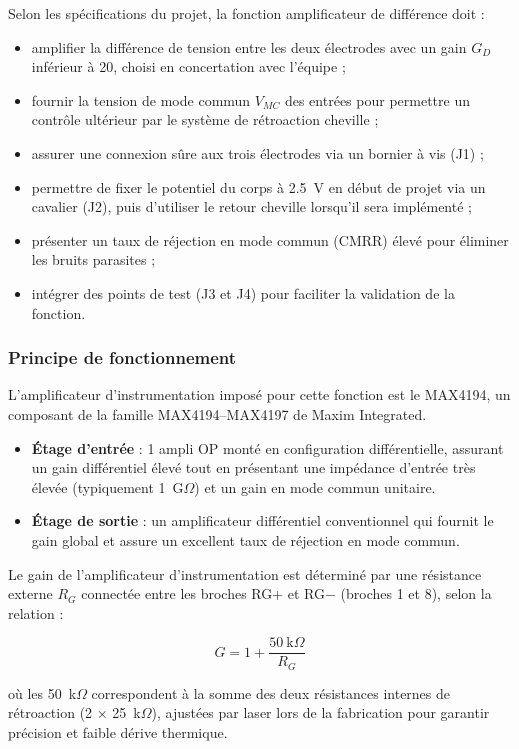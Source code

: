 \documentclass{article}
\begin{document}
Selon les spécifications du projet, la fonction amplificateur de différence doit :
\begin{itemize}
    \item amplifier la différence de tension entre les deux électrodes avec un gain $G_D$ inférieur à 20, choisi en concertation avec l'équipe ;
    \item fournir la tension de mode commun $V_{MC}$ des entrées pour permettre un contrôle ultérieur par le système de rétroaction cheville ;
    \item assurer une connexion sûre aux trois électrodes via un bornier à vis (J1) ;
    \item permettre de fixer le potentiel du corps à 2.5~V en début de projet via un cavalier (J2), puis d'utiliser le retour cheville lorsqu'il sera implémenté ;
    \item présenter un taux de réjection en mode commun (CMRR) élevé pour éliminer les bruits parasites ;
    \item intégrer des points de test (J3 et J4) pour faciliter la validation de la fonction.
\end{itemize}

\subsubsection{Principe de fonctionnement}

L'amplificateur d'instrumentation imposé pour cette fonction est le MAX4194, un composant de la famille MAX4194–MAX4197 de Maxim Integrated. 

\begin{itemize}
    \item \textbf{Étage d'entrée} : 1 ampli OP monté en configuration différentielle, assurant un gain différentiel élevé tout en présentant une impédance d'entrée très élevée (typiquement 1~G$\Omega$) et un gain en mode commun unitaire.
    \item \textbf{Étage de sortie} : un amplificateur différentiel conventionnel qui fournit le gain global et assure un excellent taux de réjection en mode commun.
\end{itemize}

Le gain de l'amplificateur d'instrumentation est déterminé par une résistance externe $R_G$ connectée entre les broches RG+ et RG− (broches 1 et 8), selon la relation :

\[
G = 1 + \frac{50~\text{k}\Omega}{R_G}
\]

où les 50~k$\Omega$ correspondent à la somme des deux résistances internes de rétroaction (2 × 25~k$\Omega$), ajustées par laser lors de la fabrication pour garantir précision et faible dérive thermique.
\end{document}

